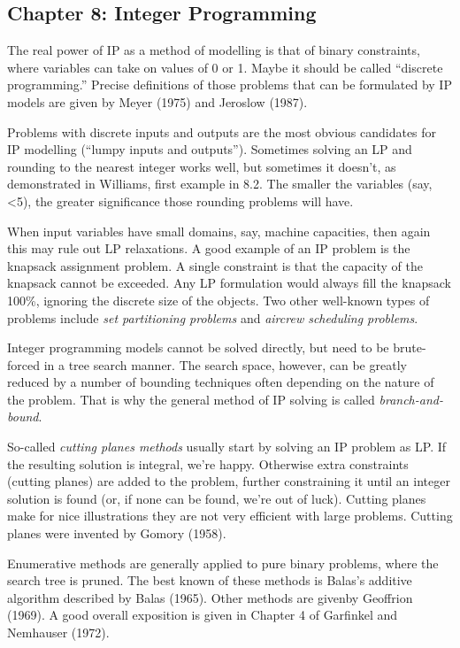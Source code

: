 \documentclass[13pt, letterpaper, twoside]{book}
\begin{document}
\subsection{Chapter 8: Integer Programming}

The real power of IP as a method of modelling is that of binary constraints, where variables can take on values of 0 or 1. Maybe it should be called ``discrete programming.'' Precise definitions of those problems that can be formulated by IP models are given by Meyer (1975) and Jeroslow (1987). 

Problems with discrete inputs and outputs are the most obvious candidates for IP modelling (``lumpy inputs and outputs''). Sometimes solving an LP and rounding to the nearest integer works well, but sometimes it doesn't, as demonstrated in Williams, first example in 8.2. The smaller the variables (say, <5), the greater significance those rounding problems will have. 

When input variables have small domains, say, machine capacities, then again this may rule out LP relaxations. A good example of an IP problem is the knapsack assignment problem. A single constraint is that the capacity of the knapsack cannot be exceeded. Any LP formulation would always fill the knapsack 100\%, ignoring the discrete size of the objects. Two other well-known types of problems include \textit{set partitioning problems} and \textit{aircrew scheduling problems}. 

Integer programming models cannot be solved directly, but need to be brute-forced in a tree search manner. The search space, however, can be greatly reduced by a number of bounding techniques often depending on the nature of the problem. That is why the general method of IP solving is called \textit{branch-and-bound}.

So-called \textit{cutting planes methods} usually start by solving an IP problem as LP. If the resulting solution is integral, we're happy. Otherwise extra constraints (cutting planes) are added to the problem, further constraining it until an integer solution is found (or, if none can be found, we're out of luck). Cutting planes make for nice illustrations they are not very efficient with large problems. Cutting planes were invented by Gomory (1958).

Enumerative methods are generally applied to pure binary problems, where the search tree is pruned. The best known of these methods is Balas's additive algorithm described by Balas (1965). Other methods are givenby Geoffrion (1969). A good overall exposition is given in Chapter 4 of Garfinkel and Nemhauser (1972).
\end{document}
